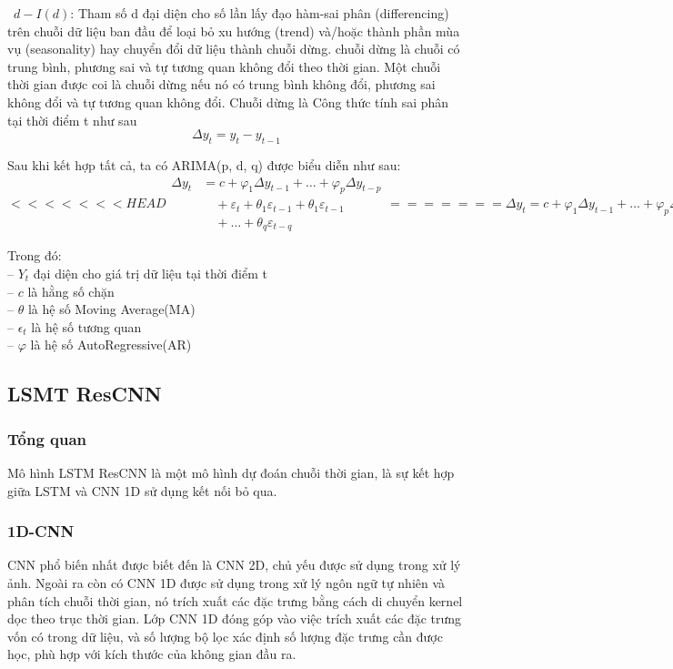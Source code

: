 \documentclass[conference]{IEEEtran}
\begin{document}
\indent\textbullet\  \(d-I(d)\): Tham số d đại diện cho số lần lấy đạo hàm-sai phân (differencing) trên chuỗi dữ liệu ban đầu để loại bỏ xu hướng (trend) và/hoặc thành phần mùa vụ (seasonality) hay chuyển đổi dữ liệu thành chuỗi dừng. chuỗi dừng là chuỗi có trung bình, phương sai và tự tương quan không đổi theo thời gian. Một chuỗi thời gian được coi là chuỗi dừng nếu nó có trung bình không đổi, phương sai không đổi và tự tương quan không đổi. Chuỗi dừng là Công thức tính sai phân tại thời điểm t như sau
\[
    \Delta y_t = y_t - y_{t-1}
\]

Sau khi kết hợp tất cả, ta có ARIMA(p, d, q) được biểu diễn như sau:
\[
    <<<<<<< HEAD
    \begin{split}
        \Delta y_t & = c + \varphi_1 \Delta y_{t-1} + \ldots + \varphi_p \Delta y_{t-p}              \\
                   & \quad + \varepsilon_t + \theta_1 \varepsilon_{t-1} + \theta_1 \varepsilon_{t-1} \\
                   & \quad + \ldots + \theta_q \varepsilon_{t-q}
    \end{split}
    =======
    \Delta y_t = c + \varphi_1 \Delta y_{t-1} + \ldots + \varphi_p \Delta y_{t-p} + \varepsilon_t + \theta_1 \varepsilon_{t-1} + \theta_1 \varepsilon_{t-1} + \ldots + \theta_q \varepsilon_{t-q}
    >>>>>>> master
\]

Trong đó: \\
\indent -- \(Y_t\) đại diện cho giá trị dữ liệu tại thời điểm t\\
\indent -- \(c\) là hằng số chặn\\
\indent -- \(\theta\) là hệ số Moving Average(MA)\\
\indent -- \(\epsilon_t\) là hệ số tương quan\\
\indent -- \(\varphi\) là hệ số AutoRegressive(AR)\\

\subsection{LSMT ResCNN}
\subsubsection{Tổng quan}
Mô hình LSTM ResCNN là một mô hình dự đoán chuỗi thời gian, là sự kết hợp giữa LSTM và CNN 1D sử dụng kết nối bỏ qua.
\subsubsection{1D-CNN}
CNN phổ biến nhất được biết đến là CNN 2D, chủ yếu được sử dụng trong xử lý ảnh. Ngoài ra còn có CNN 1D được sử dụng trong xử lý ngôn ngữ tự nhiên và phân tích chuỗi thời gian, nó trích xuất các đặc trưng bằng cách di chuyển kernel dọc theo trục thời gian. Lớp CNN 1D đóng góp vào việc trích xuất các đặc trưng vốn có trong dữ liệu, và số lượng bộ lọc xác định số lượng đặc trưng cần được học, phù hợp với kích thước của không gian đầu ra.
\end{document}

